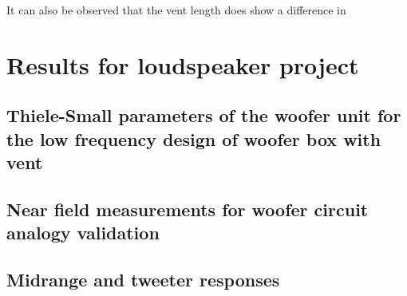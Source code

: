 \documentclass[a4paper,10pt]{article}
\begin{document}
It can also be observed that the vent length does show a difference in 


\section{Results for loudspeaker project}

\subsection{Thiele-Small parameters of the woofer unit for the low frequency design of woofer box with vent}

\subsection{Near field measurements for woofer circuit analogy validation}

\subsection{Midrange and tweeter responses}
\end{document}
